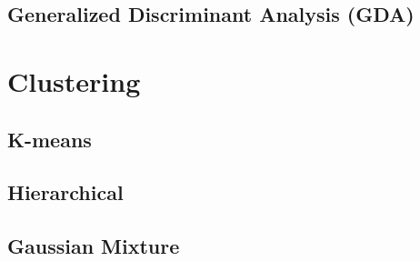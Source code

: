 \documentclass[../thesis.tex]{subfiles}
\begin{document}
\subsection{Generalized Discriminant Analysis (GDA)}

\newpage

\section{Clustering}

\subsection{K-means}

\subsection{Hierarchical}

\subsection{Gaussian Mixture}

\newpage{\pagestyle{empty}\cleardoublepage}
\end{document}
